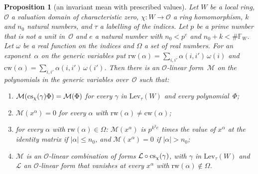 \documentclass[11pt,a4paper]{article}
\newcommand{\m}[1]{\mbox{$#1$}}        %
\theoremstyle{plainx}
\newtheorem{proposition}[theorem]{Proposition}
\theoremstyle{uprightx}
\newcommand{\cO}{\mathcal{O}}
\newcommand{\FF}{\mathbb{F}}
\newcommand{\cL}{\mathcal{L}}
\newcommand{\cM}{\mathcal{M}}
\newcommand{\Lev}{\mathrm{Lev}}
\begin{document}
\begin{proposition}[an invariant mean with prescribed values]\label{p:mean}
Let $W$ be a local ring, $\cO$ a valuation domain of characteristic zero, \m{\chi\colon W\to\cO} a ring
homomorphism, $k$ and $n_0$ natural numbers, and $\tau$ a labelling of the indices. Let $p$ be a prime number
that is not a unit in~$\cO$ and $e$ a natural number with \m{n_0<p^{e}} and \m{n_0+k<\#\FF_W}. Let $\omega$ be a
real function on the indices and $\Omega$ a set of real numbers. For an exponent~$\alpha$ on the generic
variables put \m{\mathrm{rw}(\alpha)=\sum_{i,i'}\alpha(i,i')\,\omega(i)} and
\m{\mathrm{cw}(\alpha)=\sum_{i,i'}\alpha(i,i')\,\omega(i')}. Then there is an $\cO$-linear form~$\cM$ on the
polynomials in the generic variables over~$\cO$ such that:
\begin{enumerate}[label=\textup{(\alph*)},leftmargin=2.3em,itemsep=1pt,topsep=2pt]
\item \m{\cM(\conjSubst{\chi}{\gamma}\Phi)=\cM(\Phi)} for every $\gamma$ in \m{\Lev_{\tau}(W)} and every
polynomial~$\Phi$;
\item \m{\cM(x^{\alpha})=0} for every $\alpha$ with \m{\mathrm{rw}(\alpha)\ne\mathrm{cw}(\alpha)};
\item for every $\alpha$ with \m{\mathrm{rw}(\alpha)\in\Omega}: \m{\cM(x^{\alpha})} is \m{p^{k^{2}e}} times the value
of \m{x^{\alpha}} at the identity matrix if \m{|\alpha|\le n_0}, and \m{\cM(x^{\alpha})=0} if \m{|\alpha|>n_0};
\item $\cM$ is an $\cO$-linear combination of forms \m{\cL\circ\conjSubst{\chi}{\gamma}}, with $\gamma$ in
\m{\Lev_{\tau}(W)} and $\cL$ an $\cO$-linear form that vanishes at every \m{x^{\alpha}} with
\m{\mathrm{rw}(\alpha)\notin\Omega}.
\end{enumerate}
\end{proposition}
\end{document}
